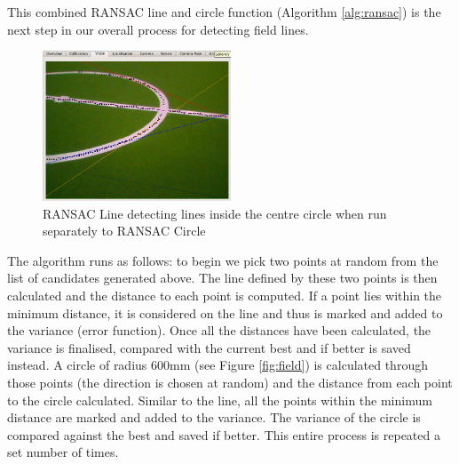 \documentclass[runningheads,a4paper]{llncs}
\begin{document}
This combined RANSAC line and circle function (Algorithm \ref{alg:ransac}) is the next step in our overall process for detecting field lines.

\begin{figure}[h]
\centering
\includegraphics[width=0.5\textwidth]{Pictures/circleFail.png}
\caption{RANSAC Line detecting lines inside the centre circle when run separately to RANSAC Circle}
\label{fig:circleFail}
\end{figure}

The algorithm runs as follows: to begin we pick two points at random from the list of candidates generated above. The line defined by these two points is then calculated and the distance to each point is computed. If a point lies within the minimum distance, it is considered on the line and thus is marked and added to the variance (error function). Once all the distances have been calculated, the variance is finalised, compared with the current best and if better is saved instead. A circle of radius 600mm (see Figure \ref{fig:field}) is calculated through those points (the direction is chosen at random) and the distance from each point to the circle calculated. Similar to the line, all the points within the minimum distance are marked and added to the variance. The variance of the circle is compared against the best and saved if better. This entire process is repeated a set number of times.
\end{document}
